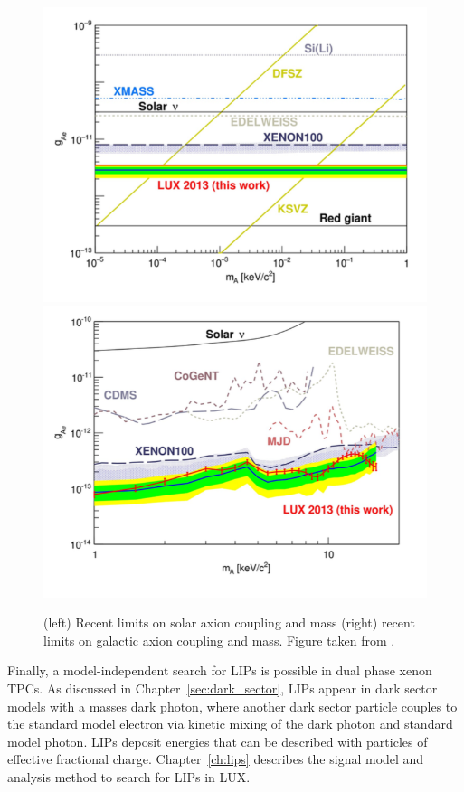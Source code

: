 \begin{figure}[htbp]
\begin{center}
\includegraphics[width=\halffig]{figures/lxetpcs/axions1.png}
\includegraphics[width=\halffig]{figures/lxetpcs/axions2.png}
\caption{(left) Recent limits on solar axion coupling and mass (right) recent limits on galactic axion coupling and mass. Figure taken from \cite{LUXAxions}. }
\label{fig:axions}
\end{center}
\end{figure}

Finally, a model-independent search for \ac{LIP}s is possible in dual phase xenon \ac{TPC}s. As discussed in Chapter~\ref{sec:dark_sector}, \ac{LIP}s appear in dark sector models with a masses dark photon, where another dark sector particle couples to the standard model electron via kinetic mixing of the dark photon and standard model photon. \ac{LIP}s deposit energies that can be described with particles of effective fractional charge. Chapter~\ref{ch:lips} describes the signal model and analysis method to search for \ac{LIP}s in \ac{LUX}. 






